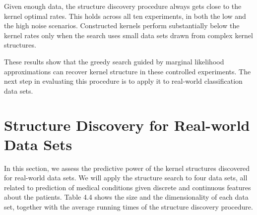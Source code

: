 \documentclass[a4paper,12pt ]{report}
\renewcommand{\GP}{{GP}}
\begin{document}
Given enough data, the structure discovery procedure always gets close to the kernel optimal rates. This holds across all ten experiments, in both the low and the high noise scenarios. Constructed kernels perform substantially below the kernel rates only when the search uses small data sets drawn from complex kernel structures.

These results show that the greedy search guided by marginal likelihood approximations can recover kernel structure in these controlled experiments. The next step in evaluating this procedure is to apply it to real-world classification data sets.



\clearpage

\section{Structure Discovery for Real-world Data Sets}



In this section, we assess the predictive power of the kernel structures discovered for real-world data sets. We will apply the structure search to four data sets, all related to prediction of medical conditions given discrete and continuous features about the patients. Table 4.4 shows the size and the dimensionality of each data set, together with the average running times of the structure discovery procedure.

\end{document}
